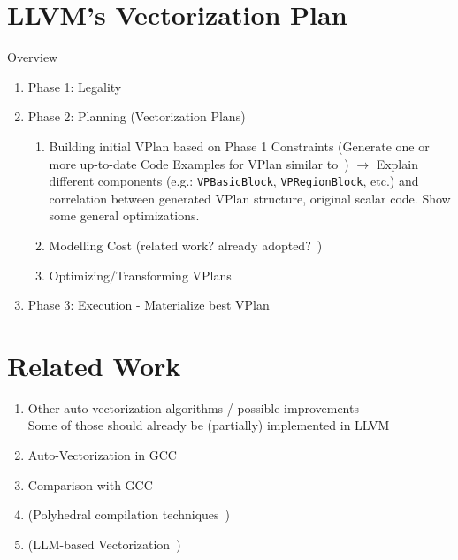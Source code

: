 \documentclass[sigplan,11pt,nonacm]{acmart}
\begin{document}
\section{LLVM's Vectorization Plan}
\label{sec:vplan}
  Overview~\cite{llvmvec,llvmvplan,llvmextloopvec,llvmintrvplan,llvmvplanstate,llvmvplanrv,llvmouterloop,llvmvplanupdate}
\begin{enumerate}
  \item Phase 1: Legality
  \item Phase 2: Planning (Vectorization Plans)
  \begin{enumerate}
    \item Building initial VPlan based on Phase 1 Constraints (Generate one or more up-to-date Code Examples for VPlan similar to~\cite{llvmintrvplan,llvmvplanstate,llvmouterloop})
    $\rightarrow$ Explain different components (e.g.: \texttt{VPBasicBlock}, \texttt{VPRegionBlock}, etc.) and
    correlation between generated VPlan structure, original scalar code. Show some general optimizations.
    \item Modelling Cost (related work? already adopted?~\cite{POHL2020102106})
    \item Optimizing/Transforming VPlans
  \end{enumerate}
  \item Phase 3: Execution - Materialize best VPlan
\end{enumerate}




\section{Related Work}
\label{sec:relatedwork}
\begin{enumerate}
  \item Other auto-vectorization algorithms / possible improvements~\cite{10.5555/3615924.3615932,4336219,llvmveccontrolflow,saarlandrv,10.1145/3303117.3306172}
  \\Some of those should already be (partially) implemented in LLVM
  \item Auto-Vectorization in GCC~\cite{autovecoptgcc, vecoptgcc}
  \item Comparison with GCC~\cite{gccllvmveccomp,10.1155/2021/3264624}
  \item (Polyhedral compilation techniques~\cite{llvmpolyhedral})
  \item (LLM-based Vectorization~\cite{taneja2024llmvectorizerllmbasedverifiedloop})
\end{enumerate}
\end{document}
